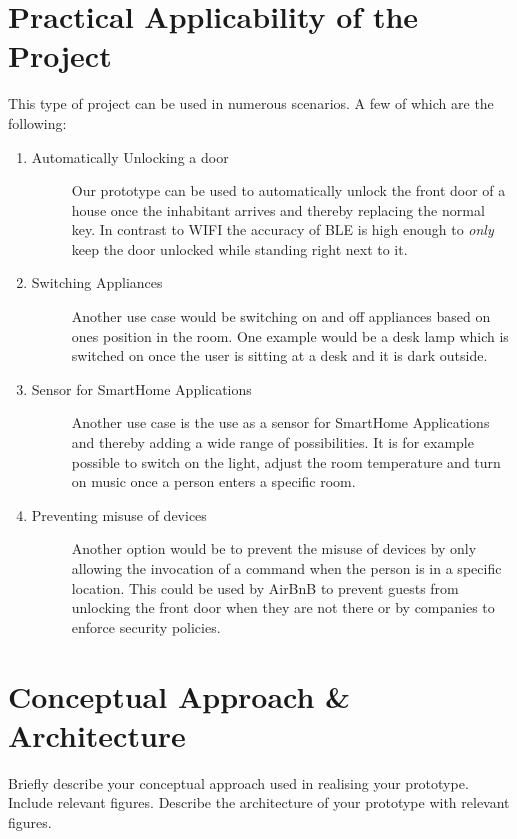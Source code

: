 \documentclass[
10pt, %
a4paper, %
oneside, %
headinclude,footinclude, %
BCOR5mm, %
]{scrartcl}
\begin{document}
\section{Practical Applicability of the Project}
This type of project can be used in numerous scenarios. A few of which are the following:
\begin{enumerate}
\item 
	\begin{description}
	\item[Automatically Unlocking a door] Our prototype can be used to automatically unlock the front door of a house once the inhabitant arrives and thereby replacing the normal key. In contrast to WIFI the accuracy of BLE is high enough to \emph{only} keep the door unlocked while standing right next to it.
	\end{description}
	\item 
	\begin{description}
	\item[Switching Appliances] Another use case would be switching on and off appliances based on ones position in the room. One example would be a desk lamp which is switched on once the user is sitting at a desk and it is dark outside.
	\end{description}
	\item
	\begin{description}
	\item[Sensor for SmartHome Applications] Another use case is the use as a sensor for SmartHome Applications and thereby adding a wide range of possibilities. It is for example possible to switch on the light, adjust the room temperature and turn on music once a person enters a specific room.
	\end{description}
	\item
	\begin{description}
	\item[Preventing misuse of devices] Another option would be to prevent the misuse of devices by only allowing the invocation of a command when the person is in a specific location. This could be used by AirBnB to prevent guests from unlocking the front door when they are not there or by companies to enforce security policies.
	\end{description}
\end{enumerate}

\section{Conceptual Approach \& Architecture}
Briefly describe your conceptual approach used in realising your prototype. Include relevant figures. Describe the architecture of your prototype with relevant figures.
\end{document}
